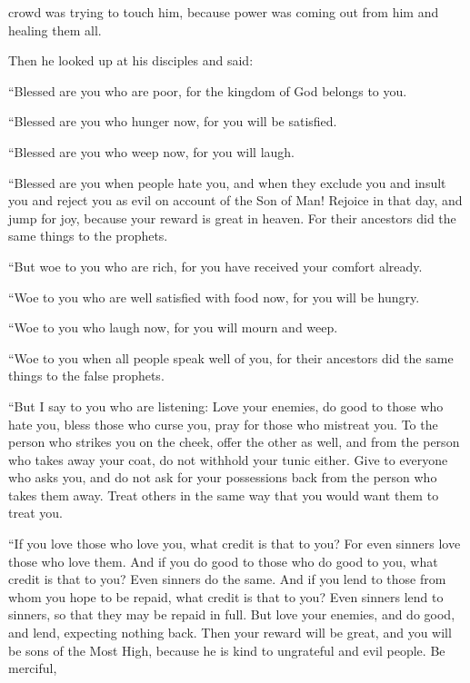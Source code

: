 {crowd
was trying
to touch
him,
because
power
was coming out
from
him
and
healing
them all.
\par }{\PP {}Then
he
looked up
at his
disciples
and said:
\par }{\Q “Blessed
are you who are poor,
for
the kingdom
of God
belongs
to you.
\par }{\Q {}“Blessed
are you who hunger
now,
for
you will be satisfied.
\par }{\Q “Blessed
are you who weep
now,
for
you will laugh.
\par }{\Q {}“Blessed
are you
when
people
hate
you,
and
when
they exclude
you
and
insult
you and
reject
you
as
evil
on account of
the Son
of Man!
Rejoice
in
that
day,
and
jump for joy,
because
your
reward
is great
in
heaven.
For
their
ancestors
did
the same things
to the prophets.
\par }{\Q {}“But
woe
to you
who are rich,
for
you have received
your
comfort already.
\par }{\Q {}“Woe
to you
who are well satisfied with food
now,
for
you will be hungry.
\par }{\Q “Woe
to you who laugh
now,
for
you will mourn
and
weep.
\par }{\Q {}“Woe
to you when
all
people
speak
well
of you,
for
their
ancestors
did
the same things
to the false prophets.
\par }{\PP {}“But
I say
to you
who are listening: Love
your
enemies,
do
good
to those who hate
you,
bless
those who curse
you,
pray
for
those who mistreat
you.
To the person who strikes
you
on
the cheek,
offer
the other
as well, and
from
the person who takes away
your
coat,
do
not
withhold
your tunic
either.
Give
to everyone
who asks
you,
and
do
not
ask for
your possessions
back
from
the person who takes
them away.
Treat
others
in the same way
that you would want
them
to
treat
you.
\par }{\PP {}“If
you love
those who love
you,
what
credit
is
that to you? For
even sinners
love
those who love
them.
And
if
you do good
to those who do good
to you,
what
credit
is
that to you? Even sinners
do
the same.
And
if
you lend
to those from
whom
you hope
to be repaid,
what
credit
is
that to you? Even sinners
lend
to sinners,
so that
they may be repaid
in full.
But
love
your
enemies,
and
do good,
and
lend,
expecting
nothing
back.
Then
your
reward
will be
great,
and
you will be
sons
of the Most High,
because
he
is
kind
to
ungrateful
and
evil people.
Be
merciful,
}
